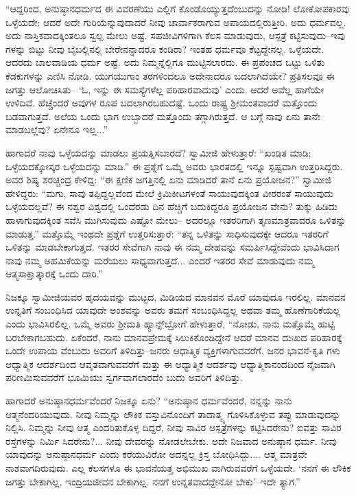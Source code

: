 “ಆದ್ದರಿಂದ, ಅನುಷ್ಠಾನಧರ್ಮದ ಈ ವಿವರಣೆಯು ಎಲ್ಲಿಗೆ ಕೊಂಡೊಯ್ಯುತ್ತದೆಂಬುದನ್ನು ನೋಡಿ! ಲೋಕೋಪಕಾರವು ಒಳ್ಳೆಯದೇ; ಆದರೆ ಅದೇ ಗುರಿಯೆನ್ನುವುದಾದರೆ ನೀವು ಚಾರ್ವಾಕರಾಗುವ ಅಪಾಯದಲ್ಲಿರುತ್ತೀರಿ. ಅದು ಧರ್ಮವಲ್ಲ. ಅದು ನಾಸ್ತಿಕವಾದಕ್ಕಿಂತಲೂ ಸ್ವಲ್ಪ ಮೇಲು ಅಷ್ಟೆ. ಸಹಜೀವಿಗಳಿಗಾಗಿ ಕೆಲಸ ಮಾಡುವುದು, ಆಸ್ಪತ್ರೆ ಕಟ್ಟಿಸುವುದು–ಇವು ಗಳನ್ನು ಬಿಟ್ಟು ನೀವು ಬೈಬಲ್ಲಿನಲ್ಲಿ ಬೇರೇನನ್ನಾದರೂ ಕಂಡಿರಾ? ಇಂತಹ ಧರ್ಮವೂ ಕೆಟ್ಟದ್ದೇನಲ್ಲ. ಒಳ್ಳೆಯದೇ. ಆದರದು ಬಾಲವಾಡಿಯ ಧರ್ಮ ಅಷ್ಟೆ. ಅದು ನಿಮ್ಮನ್ನೆಲ್ಲಿಗೂ ಮುಟ್ಟಿಸಲಾರದು. ಈ ಪ್ರಪಂಚದ ಒಟ್ಟು ಒಳಿತು ಕೆಡಕುಗಳನ್ನು ಎಣಿಸಿ ನೋಡಿ. ಯುಗಯುಗಾಂ ತರಗಳಿಂದಲೂ ಅದೇನಾದರೂ ಬದಲಾಗಿದೆಯೇ? ಪ್ರತಿಸಲವೂ ಈ ಜಗತ್ತು ಆಲೋಚಿಸಿತು– ‘ಓ, ಇನ್ನು ಈ ಸಮಸ್ಯೆಗಳೆಲ್ಲ ಪರಿಹಾರವಾದುವು’ ಎಂದು. ಆದರೆ ಅವೆಲ್ಲ ಹಾಗೆಯೇ ಉಳಿದಿವೆ. ಹೆಚ್ಚೆಂದರೆ ಅವುಗಳ ರೂಪ ಬದಲಾಗಿರಬಹುದಷ್ಟೆ. ಒಂದು ರಾಷ್ಟ್ರ ಶ್ರೀಮಂತವಾದರೆ ಮತ್ತೊಂದು ಬಡವಾಗುತ್ತದೆ. ಅಲೆಯ ಒಂದು ಭಾಗ ಉಬ್ಬಾದರೆ ಮತ್ತೊಂದು ತಗ್ಗಾಗಿರುತ್ತದೆ. ಆ ಬಗ್ಗೆ ನಾವು ಏನು ತಾನೇ ಮಾಡಬಲ್ಲೆವು? ಏನೇನೂ ಇಲ್ಲ...”

ಹಾಗಾದರೆ ನಾವು ಒಳ್ಳೆಯದನ್ನು ಮಾಡಲು ಪ್ರಯತ್ನಿಸಬಾರದೆ? ಸ್ವಾಮೀಜಿ ಹೇಳುತ್ತಾರೆ: “ಖಂಡಿತ ಮಾಡಿ; ಒಳ್ಳೆಯದಕ್ಕೋಸ್ಕರ ಒಳ್ಳೆಯದನ್ನು ಮಾಡಿ.” ಈ ಪ್ರಶ್ನೆಗೆ ಒಮ್ಮೆ ಅವರು ಭಾರತದಲ್ಲಿ ಇನ್ನೂ ಸ್ಪಷ್ಟವಾಗಿ ಉತ್ತರಿಸಿದ್ದರು. ಅವರ ಶಿಷ್ಯ ಶರಚ್ಚಂದ್ರ ಕೇಳಿದ್ದ: “ಈ ಕ್ಷಣಿಕ ಜಗತ್ತಿನಲ್ಲಿ ಏನು ಮಾಡಿದರೆ ತಾನೆ ಏನು ಪ್ರಯೋಜನ?” ಸ್ವಾಮೀಜಿ ಹೇಳಿದ್ದರು: “ಮಗು, ಸಾವು ತಪ್ಪಿದ್ದಲ್ಲವೆಂದ ಮೇಲೆ ಕ್ರಿಮಿಕೀಟಗಳಂತೆ ಸಾಯುವುದಕ್ಕಿಂತ ವೀರರಂತೆ ಸಾಯುವುದು ಒಳ್ಳೆಯದಲ್ಲವೆ? ಈ ನಶ್ವರ ವಿಶ್ವದಲ್ಲಿ ಒಂದೆರಡು ದಿನ ಹೆಚ್ಚಿಗೆ ಬದುಕಿದ್ದರೂ ಪ್ರಯೋಜನ ವೇನು? ತುಕ್ಕು ಹಿಡಿದು ಹಾಳಾಗುವುದಕ್ಕಿಂತ ಸವೆಸಿ ಮುಗಿಸುವುದು ಎಷ್ಟೋ ಮೇಲು– ಅದರಲ್ಲೂ ಇತರರಿಗಾಗಿ ತೃಣಮಾತ್ರವಾದರೂ ಒಳಿತನ್ನು ಮಾಡುತ್ತ.” ಮತ್ತೊಮ್ಮೆ ಇಂಥದೇ ಪ್ರಶ್ನೆಗೆ ಉತ್ತರಿಸುತ್ತಾರೆ: “ತನ್ನ ಒಳಿತನ್ನು ಸಾಧಿಸುವುದಕ್ಕೇ ಆದರೂ ಇತರರಿಗೆ ಒಳಿತನ್ನು ಮಾಡಬೇಕಾಗುತ್ತದೆ. ಇತರರ ಸೇವೆಗಾಗಿ ನಾವು ಈ ನಮ್ಮ ದೇಹವನ್ನು ಸಮರ್ಪಿಸಿದ್ದೇವೆಂದು ಭಾವಿಸಿದಾಗ ನಾವು ನಮ್ಮ ಅಹಮಿಕೆಯನ್ನು ಮರೆಯಲು ಸಾಧ್ಯವಾಗುತ್ತದೆ... ಎಂದರೆ ಇತರರ ಸೇವೆ ಮಾಡುವುದು ನಮ್ಮ ಆತ್ಮಸಾಕ್ಷಾತ್ಕಾರಕ್ಕೆ ಒಂದು ದಾರಿ.”

ನಿಜಕ್ಕೂ ಸ್ವಾಮೀಜಿಯವರ ಹೃದಯವನ್ನು ಮುಟ್ಟದ, ಮಿಡಿಯದ ಮಾನವನ ಮೊರೆ ಯಾವುದೂ ಇರಲಿಲ್ಲ. ಮಾನವನ ಉನ್ನತಿಗೆ ಸಂಬಂಧಿಸಿದ ಯಾವುದೇ ಅಂಶವನ್ನು ಅವರು ತಮಗೆ ಸಂಬಂಧಿಸಿದ್ದಲ್ಲ ಅಥವಾ ತಮ್ಮ ಹೊಣೆಗಾರಿಕೆಯಲ್ಲ ಎಂದು ಭಾವಿಸಿರಲಿಲ್ಲ. ಒಮ್ಮೆ ಅವರು ಶ್ರೀಮತಿ ಹ್ಯಾನ್ಸ್​ಬ್ರೋಗೆ ಹೇಳುತ್ತಾರೆ, “ನೋಡು, ನಾನು ಮತ್ತೊಮ್ಮೆ ಹುಟ್ಟಿ ಬರಬೇಕಾಗಬಹುದು. ಏಕೆಂದರೆ, ನಾನು ಮಾನವಪ್ರೇಮಕ್ಕೆ ಸಿಲುಕಿಕೊಂಡಿದ್ದೇನೆ  ಆದರೆ ಮಾನವ ದುಃಖದ ಪರಿಹಾರಕ್ಕೆ ಒಂದೇ ಉಪಾಯ ವೆಂಬುದು ಅವರಿಗೆ ತಿಳಿದಿತ್ತು–ಜನರು ಆಧಾತ್ಮಿಕ ವ್ಯಕ್ತಿಗಳಾಗುವವರೆಗೆ, ಜನರ ಭಾವನೆ-ಕೃತಿ ಗಳು ಆಧ್ಯಾತ್ಮಿಕ ಆದರ್ಶದಿಂದ ಆವೃತವಾಗುವವರೆಗೆ ಮತ್ತು ಈ ಆಧ್ಯಾತ್ಮಿಕ ಆದರ್ಶವು ಆಧ್ಯಾತ್ಮಿಕಾನಂದದಿಂದ ನೈಜವಾಗಿ ಪರಿಣಮಿಸುವವರೆಗೆ ಭೂಮಿಯು ಸ್ವರ್ಗವಾಗಲಾರದೆಂ ಬುದು ಅವರಿಗೆ ತಿಳಿದಿತ್ತು.

ಹಾಗಾದರೆ ಅನುಷ್ಠಾನಧರ್ಮವೆಂದರೆ ನಿಜಕ್ಕೂ ಏನು? “ಅನುಷ್ಠಾನ ಧರ್ಮವೆಂದರೆ, ನನ್ನನ್ನು ನಾನು ಆತ್ಮನೆಂದರಿಯುವುದು. ನೀವು ನಿಮ್ಮನ್ನು ಲೌಕಿಕ ವಸ್ತುವಿನೊಂದಿಗೆ ತಾದಾತ್ಮ್ಯ ಗೊಳಿಸಿಕೊಳ್ಳುವ ತಪ್ಪು ಮಾಡುವುದನ್ನು ನಿಲ್ಲಿಸಿ. ನಿಮ್ಮನ್ನು ನೀವು ಆತ್ಮ ಎಂದರಿತುಕೊಳ್ಳ ದಿದ್ದರೆ, ನೀವು ಸಾವಿರ ಆಸ್ಪತ್ರೆಗಳನ್ನು ಕಟ್ಟಿಸಿದರೇನು? ಐವತ್ತು ಸಾವಿರ ರಸ್ತೆಗಳನ್ನು ನಿರ್ಮಿ ಸಿದರೇನು?... ನೀವು ದೇವರನ್ನು ನೋಡಲೇಬೇಕು. ಅದೇ ನಿಜವಾದ ಅನುಷ್ಠಾನ ಧರ್ಮ. ನೀವು ಯಾವುದನ್ನು ಅನುಷ್ಠಾನಧರ್ಮ ಎಂದು ಕರೆಯುವಿರೋ ಅದನ್ನಲ್ಲ ಕ್ರಿಸ್ತ ಬೋಧಿಸಿದ್ದು.... ಆತ್ಮ ಮಾತ್ರವೇ ನಾಶವಾಗದಿರುವುದು. ಎಲ್ಲ ಕೆಲಸಗಳೂ ಈ ಭಾವನೆಯತ್ತ ಅಭಿಮುಖ ವಾಗಿರುವವರೆಗೆ ಒಳ್ಳೆಯದೇ. ‘ನನಗೆ ಈ ಲೌಕಿಕ ಜಗತ್ತು ಬೇಕಾಗಿಲ್ಲ, ಇಂದ್ರಿಯಜೀವನ ಬೇಕಾಗಿಲ್ಲ. ನನಗೆ ಉನ್ನತವಾದದ್ದೇನೋ ಬೇಕು’–ಇದೇ ತ್ಯಾಗ.”

